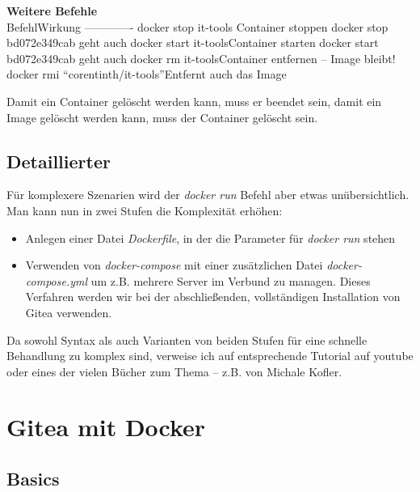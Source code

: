 \documentclass[
  letterpaper,
  DIV=11]{scrreprt}
\providecommand{\tightlist}{%
  \setlength{\itemsep}{0pt}\setlength{\parskip}{0pt}}\usepackage{longtable,booktabs,array}
\begin{document}
\textbf{Weitere Befehle}\\
\textbar Befehl\textbar Wirkung\textbar{}
\textbar------\textbar-------\textbar{} \textbar docker stop
it-tools\textbar{} Container stoppen\textbar{} \textbar docker stop
bd072e349cab\textbar{} geht auch\textbar{} \textbar docker start
it-tools\textbar Container starten\textbar{} \textbar docker start
bd072e349cab\textbar{} geht auch\textbar{} \textbar docker rm
it-tools\textbar Container entfernen -- Image bleibt!\textbar{}
\textbar docker rmi ``corentinth/it-tools''\textbar Entfernt auch das
Image\textbar{}

Damit ein Container gelöscht werden kann, muss er beendet sein, damit
ein Image gelöscht werden kann, muss der Container gelöscht sein.

\section{Detaillierter}\label{detaillierter}

Für komplexere Szenarien wird der \emph{docker run} Befehl aber etwas
unübersichtlich. Man kann nun in zwei Stufen die Komplexität erhöhen:

\begin{itemize}
\tightlist
\item
  Anlegen einer Datei \emph{Dockerfile}, in der die Parameter für
  \emph{docker run} stehen
\item
  Verwenden von \emph{docker-compose} mit einer zusätzlichen Datei
  \emph{docker-compose.yml} um z.B. mehrere Server im Verbund zu
  managen. Dieses Verfahren werden wir bei der abschließenden,
  vollständigen Installation von Gitea verwenden.
\end{itemize}

Da sowohl Syntax als auch Varianten von beiden Stufen für eine schnelle
Behandlung zu komplex sind, verweise ich auf entsprechende Tutorial auf
youtube oder eines der vielen Bücher zum Thema -- z.B. von Michale
Kofler.


\chapter{Gitea mit Docker}\label{gitea-mit-docker}

\section{Basics}\label{basics}
\end{document}
